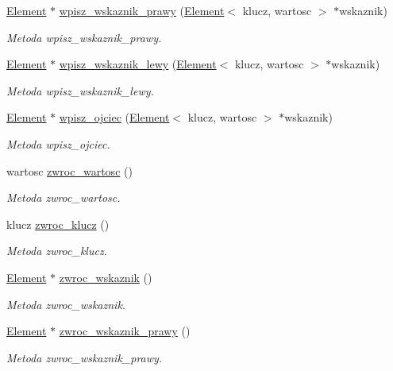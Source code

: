 \begin{DoxyCompactItemize}
\hyperlink{class_element}{Element} $\ast$ \hyperlink{class_element_aa2fa90e91a6bd79f75d9b262c68cf34f}{wpisz\-\_\-wskaznik\-\_\-prawy} (\hyperlink{class_element}{Element}$<$ klucz, wartosc $>$ $\ast$wskaznik)
\begin{DoxyCompactList}\small\item\em Metoda wpisz\-\_\-wskaznik\-\_\-prawy. \end{DoxyCompactList}\item 
\hyperlink{class_element}{Element} $\ast$ \hyperlink{class_element_ab5aaf821a1d95165c9fcfdb98f5c9fca}{wpisz\-\_\-wskaznik\-\_\-lewy} (\hyperlink{class_element}{Element}$<$ klucz, wartosc $>$ $\ast$wskaznik)
\begin{DoxyCompactList}\small\item\em Metoda wpisz\-\_\-wskaznik\-\_\-lewy. \end{DoxyCompactList}\item 
\hyperlink{class_element}{Element} $\ast$ \hyperlink{class_element_ad0356448011befb0780bed348a440153}{wpisz\-\_\-ojciec} (\hyperlink{class_element}{Element}$<$ klucz, wartosc $>$ $\ast$wskaznik)
\begin{DoxyCompactList}\small\item\em Metoda wpisz\-\_\-ojciec. \end{DoxyCompactList}\item 
wartosc \hyperlink{class_element_a5f1d13188101292091170d462cdf2fbd}{zwroc\-\_\-wartosc} ()
\begin{DoxyCompactList}\small\item\em Metoda zwroc\-\_\-wartosc. \end{DoxyCompactList}\item 
klucz \hyperlink{class_element_a4041559698851d33d77d9c457f3a5da4}{zwroc\-\_\-klucz} ()
\begin{DoxyCompactList}\small\item\em Metoda zwroc\-\_\-klucz. \end{DoxyCompactList}\item 
\hyperlink{class_element}{Element} $\ast$ \hyperlink{class_element_acee0fb7c5bbe330961d16e6e672d07d2}{zwroc\-\_\-wskaznik} ()
\begin{DoxyCompactList}\small\item\em Metoda zwroc\-\_\-wskaznik. \end{DoxyCompactList}\item 
\hyperlink{class_element}{Element} $\ast$ \hyperlink{class_element_a4366a3d51d26cdad6526425c654945dc}{zwroc\-\_\-wskaznik\-\_\-prawy} ()
\begin{DoxyCompactList}\small\item\em Metoda zwroc\-\_\-wskaznik\-\_\-prawy. \end{DoxyCompactList}\item 

\end{DoxyCompactItemize}
